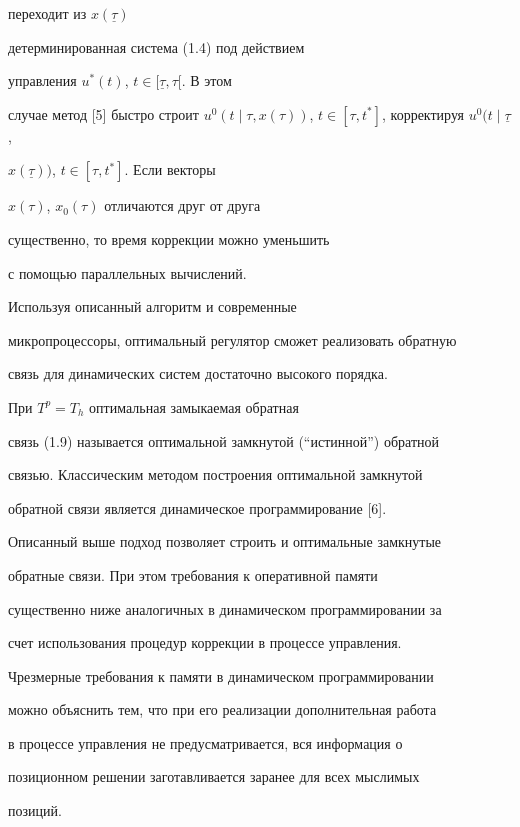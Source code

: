 переходит из $x(\underline{\tau})$


детерминированная система (1.4) под действием


управления $u^*(t)$, $t \in [\underline{\tau},\tau[$. В этом


случае метод [5] быстро строит $u^0(t\mid\tau,x(\tau))$, $t \in


[\tau,t^*]$, корректируя $u^0(t\mid\underline{\tau}$,


$x(\underline{\tau}))$, $t \in [\tau,t^*]$. Если векторы


$x(\tau)$, $x_0(\tau)$ отличаются друг от друга


существенно, то время коррекции можно уменьшить


с помощью параллельных вычислений.


Используя описанный алгоритм и современные


микропроцессоры, оптимальный регулятор сможет реализовать обратную


связь для динамических систем достаточно высокого порядка.





\begin{notes}


При $T^p=T_h$ оптимальная замыкаемая обратная


связь (1.9) называется оптимальной замкнутой (``истинной'') обратной


связью. Классическим методом построения оптимальной замкнутой


обратной связи является динамическое программирование [6].


Описанный выше подход позволяет строить и оптимальные замкнутые


обратные связи. При этом требования к оперативной памяти


существенно ниже аналогичных в динамическом программировании за


счет использования процедур коррекции в процессе управления.


Чрезмерные требования к памяти в динамическом программировании


можно объяснить тем, что при его реализации дополнительная работа


в процессе управления не предусматривается, вся информация о


позиционном решении заготавливается заранее для всех мыслимых


позиций.


\end{notes}





